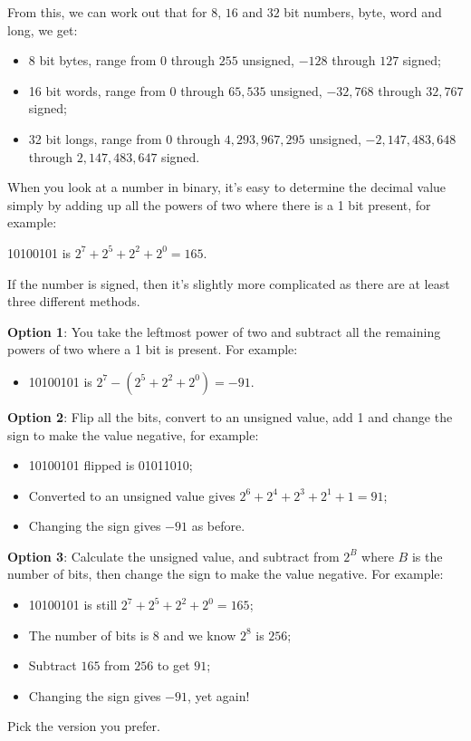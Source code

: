 From this, we can work out that for $8$, $16$ and $32$ bit numbers,
byte, word and long, we get:
\begin{itemize}
\item 8 bit bytes, range from $0$ through $255$ unsigned, $-128$ through
$127$ signed;
\item 16 bit words, range from $0$ through $65,535$ unsigned, $-32,768$
through $32,767$ signed;
\item 32 bit longs, range from $0$ through $4,293,967,295$ unsigned, $-2,147,483,648$
through $2,147,483,647$ signed.
\end{itemize}
When you look at a number in binary, it's easy to determine the decimal
value simply by adding up all the powers of two where there is a 1
bit present, for example:

10100101 is $2^{7}+2^{5}+2^{2}+2^{0}=165$.

If the number is signed, then it's slightly more complicated as there
are at least three different methods. 

\textbf{Option 1}: You take the leftmost power of two and subtract
all the remaining powers of two where a 1 bit is present. For example:
\begin{itemize}
\item 10100101 is $2^{7}-\left(2^{5}+2^{2}+2^{0}\right)=-91$.
\end{itemize}
\textbf{Option 2}: Flip all the bits, convert to an unsigned value,
add 1 and change the sign to make the value negative, for example:
\begin{itemize}
\item 10100101 flipped is 01011010;
\item Converted to an unsigned value gives $2^{6}+2^{4}+2^{3}+2^{1}+1=91$;
\item Changing the sign gives $-91$ as before.
\end{itemize}
\textbf{Option 3}: Calculate the unsigned value, and subtract from
$2^{B}$ where $B$ is the number of bits, then change the sign to
make the value negative. For example:
\begin{itemize}
\item 10100101 is still $2^{7}+2^{5}+2^{2}+2^{0}=165$;
\item The number of bits is 8 and we know $2^{8}$ is $256$;
\item Subtract $165$ from $256$ to get $91$;
\item Changing the sign gives $-91$, yet again!
\end{itemize}
Pick the version you prefer.

